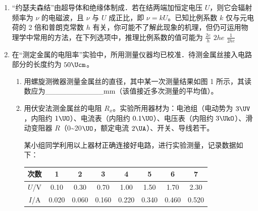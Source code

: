 \documentclass[\gkver]{gaokaozhenti}
\begin{document}
\begin{enumerate}
\item
“约瑟夫森结”由超导体和绝缘体制成．若在结两端加恒定电压 $U$，则它会辐射频率为 $\nu$ 的电磁波，且 $\nu$ 与 $U$ 成正比，即 $\nu=kU$。已知比例系数 $k$ 仅与元电荷的 2 倍和普朗克常数 $h$ 有关，你可能不了解此现象的机理，但仍可运用物理学中常用的方法，在下列选项中，推理比例系数的值可能为
{$\frac{2e}{h}$}
{$2he$}
{$\frac{1}{2he}$}

\item
在“测定金属的电阻率”实验中，所用测量仪器均已校准．待测金属丝接入电路部分的长度约为 $50\Ucm$。
\begin{enumerate}
	\item
	用螺旋测微器测量金属丝的直径，其中某一次测量结果如图 1 所示，其读数应为\_\_\_\_\_\_\_\_\_\_\_mm（该值接近多次测量的平均值）。

	\item
	用伏安法测金属丝的电阻 $R_{x}$。实验所用器材为：电池组（电动势为 $3\UV$，内阻约 $1\UO$）、电流表（内阻约 $0.1\UO$）、电压表（内阻约 $3\UkO$）、滑动变阻器 $R$（0\textasciitilde{}20$\UO$，额定电流 $2\UA$）、开关、导线若干。

	某小组同学利用以上器材正确连接好电路，进行实验测量，记录数据如下：

	\begin{center}
	\begin{tabular}{|c|c|c|c|c|c|c|c|}
	\hline
	次数 & 1 & 2 & 3 & 4 & 5 & 6 & 7 \\
	\hline
	$U$/V & 0.10 & 0.30 & 0.70 & 1.00 & 1.50 & 1.70 & 2.30 \\
	\hline
	$I$/A & 0.020 & 0.060 & 0.160 & 0.220 & 0.340 & 0.460 & 0.520 \\
	\hline
	\end{tabular}
	\end{center}


\end{enumerate}
\end{enumerate}
\end{document}
